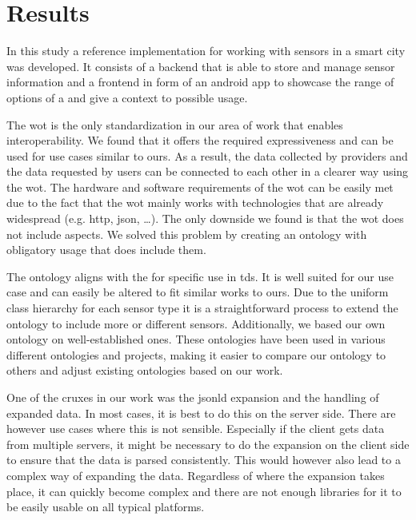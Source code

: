 \section{Results}\label{sec:results}
In this study a reference implementation for working with sensors in a smart city was developed. It consists of a backend that is able to store and manage sensor information and a frontend in form of an android app to showcase the range of options of a  and give a context to possible usage.

The \gls{wot} is the only standardization in our area of work that enables interoperability. We found that it offers the required expressiveness and can be used for use cases similar to ours.
As a result, the data collected by providers and the data requested by users can be connected to each other in a clearer way using the \gls{wot}. The hardware and software requirements of the \gls{wot} can be easily met due to the fact that the \gls{wot} mainly works with technologies that are already widespread (e.g. \gls{http}, \gls{json}, \dots). The only downside we found is that the \gls{wot} does not include  aspects. We solved this problem by creating an ontology with obligatory usage that does include them.

The ontology aligns with the  for specific use in \glspl{td}. It is well suited for our use case and can easily be altered to fit similar works to ours. Due to the uniform class hierarchy for each sensor type it is a straightforward process to extend the ontology to include more or different sensors. Additionally, we based our own ontology on well-established ones. These ontologies have been used in various different ontologies and projects, making it easier to compare our ontology to others and adjust existing ontologies based on our work.

One of the cruxes in our work was the \gls{jsonld} expansion and the handling of expanded data. In most cases, it is best to do this on the server side. There are however use cases where this is not sensible. Especially if the client gets data from multiple servers, it might be necessary to do the expansion on the client side to ensure that the data is parsed consistently. This would however also lead to a complex way of expanding the data. Regardless of where the expansion takes place, it can quickly become complex and there are not enough libraries for it to be easily usable on all typical platforms.

